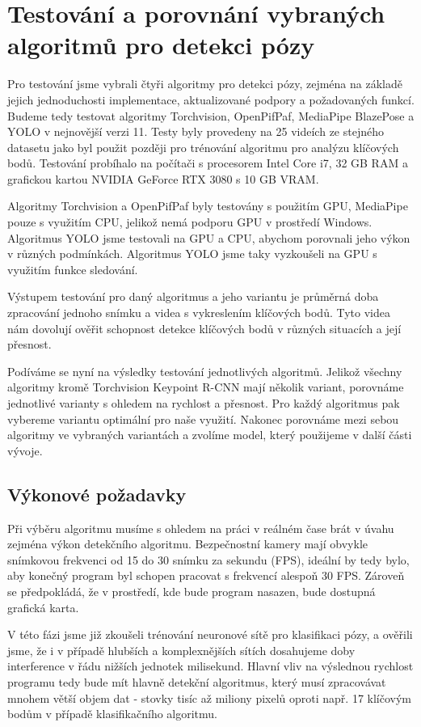 \section{Testování a porovnání vybraných algoritmů pro detekci pózy}

Pro testování jsme vybrali čtyři algoritmy pro detekci pózy, zejména na základě
jejich jednoduchosti implementace, aktualizované podpory a požadovaných funkcí.
Budeme tedy testovat algoritmy Torchvision, OpenPifPaf, MediaPipe BlazePose a
YOLO v nejnovější verzi 11. Testy byly provedeny na 25 videích ze stejného
datasetu jako byl použit později pro trénování algoritmu pro analýzu klíčových
bodů. Testování probíhalo na počítači s procesorem Intel Core i7, 32 GB RAM a
grafickou kartou NVIDIA GeForce RTX 3080 s 10 GB VRAM.

Algoritmy Torchvision a OpenPifPaf byly testovány s použitím GPU, MediaPipe
pouze s využitím CPU, jelikož nemá podporu GPU v prostředí Windows. Algoritmus
YOLO jsme testovali na GPU a CPU, abychom porovnali jeho výkon v různých
podmínkách. Algoritmus YOLO jsme taky vyzkoušeli na GPU s využitím funkce
sledování.

Výstupem testování pro daný algoritmus a jeho variantu je průměrná doba
zpracování jednoho snímku a videa s vykreslením klíčových bodů. Tyto videa nám
dovolují ověřit schopnost detekce klíčových bodů v různých situacích a její
přesnost.

Podíváme se nyní na výsledky testování jednotlivých algoritmů. Jelikož všechny
algoritmy kromě Torchvision Keypoint R-CNN mají několik variant, porovnáme
jednotlivé varianty s ohledem na rychlost a přesnost. Pro každý algoritmus pak
vybereme variantu optimální pro naše využití. Nakonec porovnáme mezi sebou
algoritmy ve vybraných variantách a zvolíme model, který použijeme v další
části vývoje.

\subsection{Výkonové požadavky}
Při výběru algoritmu musíme s ohledem na práci v reálném čase brát v úvahu
zejména výkon detekčního algoritmu. Bezpečnostní kamery mají obvykle snímkovou
frekvenci od 15 do 30 snímku za sekundu (FPS), ideální by tedy bylo, aby
konečný program byl schopen pracovat s frekvencí alespoň 30 FPS. Zároveň se
předpokládá, že v prostředí, kde bude program nasazen, bude dostupná grafická
karta.

V této fázi jsme již zkoušeli trénování neuronové sítě pro klasifikaci pózy, a
ověřili jsme, že i v případě hlubších a komplexnějších sítích dosahujeme doby
interference v řádu nižších jednotek milisekund. Hlavní vliv na výslednou
rychlost programu tedy bude mít hlavně detekční algoritmus, který musí
zpracovávat mnohem větší objem dat - stovky tisíc až miliony pixelů oproti
např. 17 klíčovým bodům v případě klasifikačního algoritmu.

